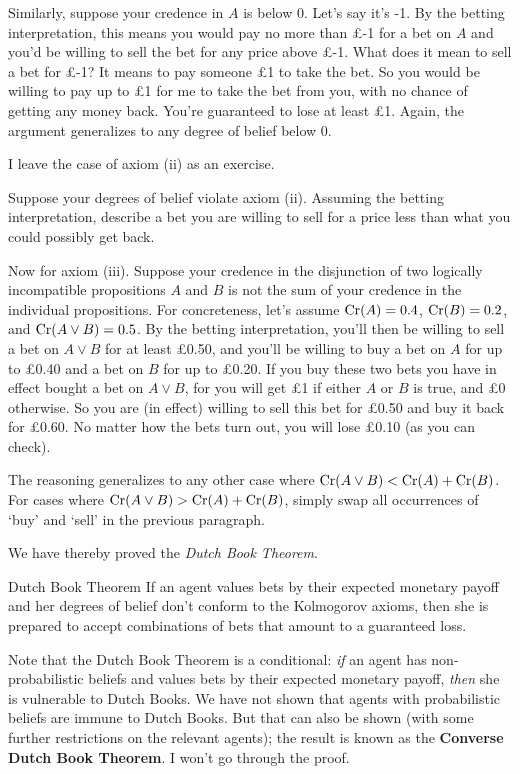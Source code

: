 Similarly, suppose your credence in $A$ is below 0. Let's say it's
-1. By the betting interpretation, this means you would pay no more
than £-1 for a bet on $A$ and you'd be willing to sell the bet for any
price above £-1. What does it mean to sell a bet for £-1?  It means to
pay someone £1 to take the bet. So you would be willing to pay up to
£1 for me to take the bet from you, with no chance of getting any
money back. You're guaranteed to lose at least £1. Again, the argument
generalizes to any degree of belief below 0.

I leave the case of axiom (ii) as an exercise.

\begin{exercise2}
  Suppose your degrees of belief violate axiom (ii). Assuming the
  betting interpretation, describe a bet you are willing to sell for a
  price less than what you could possibly get back.
\end{exercise2}

Now for axiom (iii). Suppose your credence in the disjunction of two
logically incompatible propositions $A$ and $B$ is not the sum of your
credence in the individual propositions. For concreteness, let's
assume $\text{Cr}(A) = 0.4$, $\text{Cr}(B) = 0.2$, and $\text{Cr}(A \lor B) = 0.5$. By
the betting interpretation, you'll then be willing to sell a bet on $A
\lor B$ for at least £0.50, and you'll be willing to buy a bet on $A$
for up to £0.40 and a bet on $B$ for up to £0.20. If you
buy these two bets you have in effect bought a bet on $A \lor B$, for
you will get £1 if either $A$ or $B$ is true, and £0 otherwise. So you
are (in effect) willing to sell this bet for £0.50 and buy it back for
£0.60. No matter how the bets turn out, you will lose £0.10
(as you can check).

The reasoning generalizes to any other case where
$\text{Cr}(A \lor B) < \text{Cr}(A) + \text{Cr}(B)$. For cases where
$\text{Cr}(A \lor B) > \text{Cr}(A) + \text{Cr}(B)$, simply swap all occurrences of
`buy' and `sell' in the previous paragraph.

We have thereby proved the \emph{Dutch Book Theorem}.

\begin{genericthm}{Dutch Book Theorem}
  If an agent values bets by their expected monetary payoff and her
  degrees of belief don't conform to the Kolmogorov axioms, then she
  is prepared to accept combinations of bets that amount to a
  guaranteed loss. 
\end{genericthm}

Note that the Dutch Book Theorem is a conditional: \emph{if} an agent
has non-probabilistic beliefs and values bets by their expected
monetary payoff, \emph{then} she is vulnerable to Dutch Books. We have
not shown that agents with probabilistic beliefs are immune to Dutch
Books. But that can also be shown (with some further
restrictions on the relevant agents); the result is known as the
\textbf{Converse Dutch Book Theorem}. I won't go through the proof.

